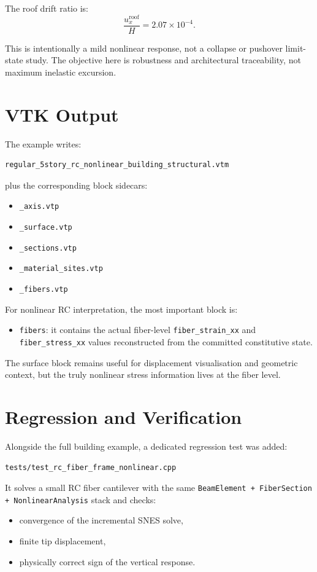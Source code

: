 The roof drift ratio is:
\[
\frac{u_x^\text{roof}}{H} = 2.07\times 10^{-4}.
\]

This is intentionally a mild nonlinear response, not a collapse or pushover
limit-state study.  The objective here is robustness and architectural
traceability, not maximum inelastic excursion.

\section{VTK Output}

The example writes:
\begin{verbatim}
regular_5story_rc_nonlinear_building_structural.vtm
\end{verbatim}
plus the corresponding block sidecars:
\begin{itemize}
  \item \texttt{\_axis.vtp}
  \item \texttt{\_surface.vtp}
  \item \texttt{\_sections.vtp}
  \item \texttt{\_material\_sites.vtp}
  \item \texttt{\_fibers.vtp}
\end{itemize}

For nonlinear RC interpretation, the most important block is:
\begin{itemize}
  \item \texttt{fibers}: it contains the actual fiber-level
        \texttt{fiber\_strain\_xx} and \texttt{fiber\_stress\_xx} values
        reconstructed from the committed constitutive state.
\end{itemize}

The surface block remains useful for displacement visualisation and geometric
context, but the truly nonlinear stress information lives at the fiber level.

\section{Regression and Verification}

Alongside the full building example, a dedicated regression test was added:
\begin{verbatim}
tests/test_rc_fiber_frame_nonlinear.cpp
\end{verbatim}

It solves a small RC fiber cantilever with the same
\texttt{BeamElement + FiberSection + NonlinearAnalysis} stack and checks:
\begin{itemize}
  \item convergence of the incremental SNES solve,
  \item finite tip displacement,
  \item physically correct sign of the vertical response.
\end{itemize}

